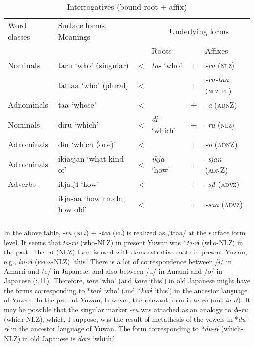 \begin{table}
\caption{\label{tab:key:39}Interrogatives (bound root + affix)}
\begin{tabular}{ll@{ }c@{ }l@{ }c@{ }l}
\lsptoprule
Word classes &   Surface forms,  Meanings & & \multicolumn{3}{c}{Underlying forms}\\\cmidrule{4-6}
             &                            & & Roots & &   Affixes\\\midrule

Nominals    & taru    ‘who’ (singular)       & < & \textit{ta-}  ‘who’    & + & \textit{{}-ru}  (\textsc{nlz})\\
            & tattaa  ‘who’ (plural)         & < &                        & + & \textit{{}-ru-taa}  (\textsc{nlz}-\textsc{pl})\\
Adnominals  & taa     ‘whose’                & < &                        & + & \textit{{}-a} (\textsc{adn}Z)\\
Nominals    & dɨru    ‘which’                & < & \textit{dɨ-}  ‘which’  & + & \textit{{}-ru} (\textsc{nlz})\\
Adnominals  & dɨn     ‘which (one)’          & < &                        & + & \textit{{}-n} (\textsc{adn}Z)\\
Adnominals  & ikjasjan ‘what kind of’        & < & \textit{ikja-}  ‘how’  & + & \textit{{}-sjan} (\textsc{adn}Z)\\
Adverbs     & ikjasjɨ  ‘how’                 & < &                        & + & \textit{{}-sjɨ} (\textsc{advz}) \\
            & ikjasaa  ‘how much; how old’   & < &                        & + & \textit{{}-saa} (\textsc{advz}) \\
\lspbottomrule
\end{tabular}
\end{table}

In the above table, \textit{{}-ru} (\textsc{nlz}) + \textit{{}-taa} (\textsc{pl}) is realized as /ttaa/ at the surface form level. It seems that \textit{ta-ru} (who-NLZ) in present Yuwan was *\textit{ta-rɨ} (who-NLZ) in the past. The \textit{{}-rɨ} (NLZ) form is used with demonstrative roots in present Yuwan, e.g., \textit{ku-rɨ} (\textsc{prox}-NLZ) ‘this.’ There is a lot of correspondence between /ɨ/ in Amami and /e/ in Japanese, and also between /u/ in Amami and /o/ in Japanese (\citealt{HirayamaEtAl1966}: 11). Therefore, \textit{tare} ‘who’ (and \textit{kore} ‘this’) in old Japanese might have the forms corresponding to *\textit{tarɨ} ‘who’ (and *\textit{kurɨ} ‘this’) in the ancestor language of Yuwan. In the present Yuwan, however, the relevant form is \textit{ta-ru} (not \textit{ta-rɨ}). It may be possible that the singular marker \textit{-ru} was attached as an analogy to \textit{dɨ-ru} (which-NLZ), which, I suppose, was the result of metathesis of the vowels in *\textit{du-rɨ} in the ancestor language of Yuwan. The form corresponding to \textit{*du-rɨ} (which-NLZ) in old Japanese is \textit{dore} ‘which.’

